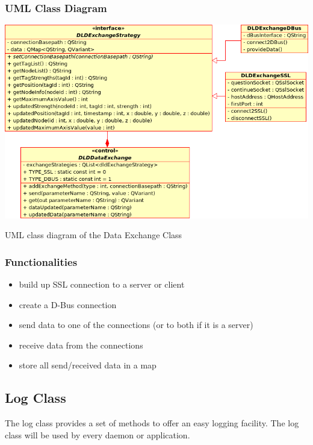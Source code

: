     \subsubsection{UML Class Diagram}
    \begin{staticFigure}
     \centering
     \includegraphics[scale=0.55]{UMLDiagrams/dldDataExchange.png}
     \caption{UML class diagram of the Data Exchange Class}
     \label{fg:projectModularization:dataExchange}
    \end{staticFigure}

    \subsubsection{Functionalities}
     \begin{itemize}
      \item build up SSL connection to a server or client
      \item create a D-Bus connection
      \item send data to one of the connections (or to both if it is a server)
      \item receive data from the connections
      \item store all send/received data in a map
     \end{itemize}

   \subsection{Log Class}
    \label{sec:design:log}
    The log class provides a set of methods to offer an easy logging facility. The log class will be used by every daemon or application.

